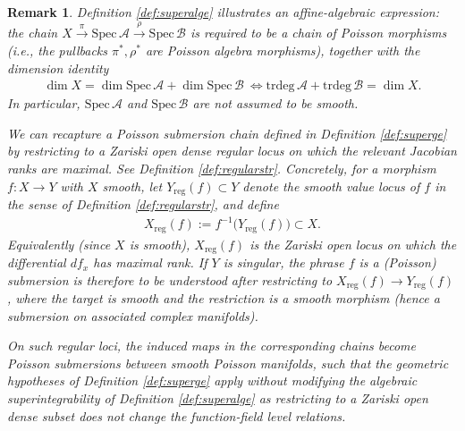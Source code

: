 \documentclass[11pt,reqno]{amsart}
\newtheorem*{theorem A}{Main Theorem A}
\newtheorem*{theorem B}{Main Theorem B}
\newtheorem*{theorem C}{Main Theorem C}
\newtheorem*{theorem D}{Main Theorem D}
\theoremstyle{definition}
\theoremstyle{plain}
\newtheorem{remark}[theorem]{Remark}
\theoremstyle{conclusion}
\begin{document}
\begin{remark} \label{rem:regularpoisub}
Definition \ref{def:superalge} illustrates an affine-algebraic expression:  the chain $  X \xrightarrow{\ \pi\ } \mathrm{Spec} \, \mathcal{A} \xrightarrow{\ \rho\ } \mathrm{Spec} \, \mathcal{B} $  is required to be a chain of Poisson morphisms (i.e., the pullbacks $\pi^*,\rho^*$ are Poisson algebra morphisms), together with the dimension identity \begin{align*}
    \dim X=\dim\mathrm{Spec} \,\mathcal{A}+\dim\mathrm{Spec} \, \mathcal{B}  \ \Longleftrightarrow  \mathrm{trdeg} \, \mathcal{A}+\mathrm{trdeg} \,\mathcal{B}=\dim X .
\end{align*}  In particular, $\mathrm{Spec} \,\mathcal{A}$ and $\mathrm{Spec} \,\mathcal{B}$ are \emph{not} assumed to be smooth. %

We can recapture a Poisson submersion chain defined in Definition \ref{def:superge} by restricting to a Zariski open dense \emph{regular locus} on which the relevant Jacobian ranks are maximal. See Definition \ref{def:regularstr}. Concretely, for a morphism $f\colon X\to Y$ with $X$ smooth, let $Y_{\mathrm{reg}}(f)\subset Y$ denote the smooth value locus of $f$ in the sense of Definition \ref{def:regularstr}, and define \begin{align*}
  X_{\mathrm{reg}}(f):=f^{-1}\bigl(Y_{\mathrm{reg}}(f)\bigr)\subset X.
\end{align*}
Equivalently (since $X$ is smooth), $X_{\mathrm{reg}}(f)$ is the Zariski open locus on which the differential $df_x$ has maximal rank. If $Y$ is singular, the phrase \emph{$f$ is a (Poisson) submersion} is therefore to be understood after restricting to $X_{\mathrm{reg}}(f)\to Y_{\mathrm{reg}}(f)$, where the target is smooth and the restriction is a smooth morphism (hence a submersion on associated complex manifolds).



On such regular loci, the induced maps in the corresponding chains become Poisson submersions between smooth Poisson manifolds, such that the geometric hypotheses of Definition \ref{def:superge} apply without modifying the algebraic superintegrability of Definition \ref{def:superalge} as restricting to a Zariski open dense subset does not change the function-field
level relations.
\end{remark}
\end{document}
